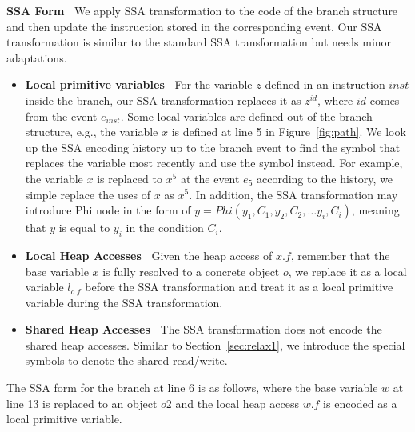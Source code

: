 {\bf SSA Form\ }  We apply SSA transformation to the code of the branch structure and then update the instruction stored in the corresponding event. Our SSA transformation is similar to the standard SSA transformation but needs minor adaptations. 
\begin{itemize}
\item {\bf Local primitive variables\ }  For the variable $z$ defined in an instruction $inst$ inside the branch, our SSA transformation replaces it as $z^{id}$, where $id$ comes from the event $e_{inst}$. Some local variables are defined out of the branch structure, e.g., the variable $x$ is defined at line 5 in Figure~\ref{fig:path}. We look up the SSA encoding history up to the branch event to find the symbol that replaces the variable most recently and use the symbol instead. For example, the variable $x$ is replaced to $x^5$ at the event $e_5$ according to the history, we simple replace the uses of $x$ as $x^5$. In addition, the SSA transformation may introduce Phi node in the form of $y=Phi(y_1, C_1, y_2, C_2, \dots y_i, C_i)$, meaning that $y$ is equal to $y_i$ in the condition $C_i$.
\item {\bf Local Heap Accesses\ } Given the heap access of $x.f$, remember that the base variable $x$ is fully resolved to a concrete object $o$, we replace it as a local variable $l_{o.f}$ before the SSA transformation and treat it as a local primitive variable during the SSA transformation. 
\item {\bf Shared Heap Accesses\ } The SSA transformation does not encode the shared heap accesses. Similar to Section~\ref{sec:relax1}, we introduce the special symbols to denote the shared read/write.
\end{itemize}

The SSA form for the branch at line 6 is as follows, where the base variable $w$ at line 13 is replaced to an object $o2$ and the local heap access $w.f$ is encoded as a local primitive variable.


